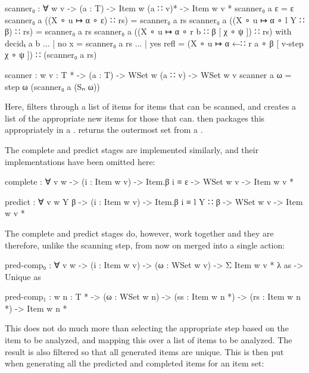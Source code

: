 		\begin{code}
	
			scanner₀ : ∀ {w v} ->
			  (a : T) ->
			  Item w (a ∷ v)* ->
			  Item w v *
			scanner₀ a ε = ε
			scanner₀ a ((X ∘ u ↦ α ∘ ε) ∷ rs) = scanner₀ a rs
			scanner₀ a ((X ∘ u ↦ α ∘ l Y ∷ β) ∷ rs) = scanner₀ a rs
			scanner₀ a ((X ∘ u ↦ α ∘ r b ∷ β [ χ ∘ ψ ]) ∷ rs) with decidₜ a b
			... | no x = scanner₀ a rs
			... | yes refl = 
			  (X ∘ u ↦ α ←∷ r a ∘ β [ v-step χ ∘ ψ ]) ∷ (scanner₀ a rs)
			
			scanner : {w v : T *} ->
			  (a : T) ->
			  WSet w (a ∷ v) ->
			  WSet w v
			scanner a ω = step ω (scanner₀ a (Sₙ ω))
		
		\end{code}
		
		Here,  filters through a list of items for items
		that can be scanned, and creates a list of the appropriate new items
		for those that can.  then packages this appropriately
		in a .  returns the outermost set from a
		.
		
		The complete and predict stages are implemented similarly, and their 
		implementations have been omitted here:
		
		\begin{code}
			
			complete : ∀ {v w} -> (i : Item w v) -> Item.β i ≡ ε ->
			  WSet w v -> Item w v *
		
			predict : ∀ {v w Y β} -> (i : Item w v) -> Item.β i ≡ l Y ∷ β ->
			  WSet w v -> Item w v *

		\end{code}
		
 		The complete and predict stages do, however, work together and they are
 		therefore, unlike the scanning step, from now on merged into a single
 		action:
 		
		\begin{code}
			
			pred-comp₀ : ∀ {v w} ->
			  (i : Item w v) ->
			  (ω : WSet w v) ->
			  Σ {Item w v *} λ as -> Unique as
			
			pred-comp₁ : {w n : T *} -> (ω : WSet w n) ->
			  (ss : Item w n *) -> (rs : Item w n *) -> Item w n *
		
		\end{code}
		
		This does not do much more than selecting the appropriate step based on
		the item to be analyzed, and mapping this over a list of items to be 
		analyzed. The result is also filtered so that all generated items are 
		unique. This is then put when generating all the predicted and 
		completed items for an item set:
		
